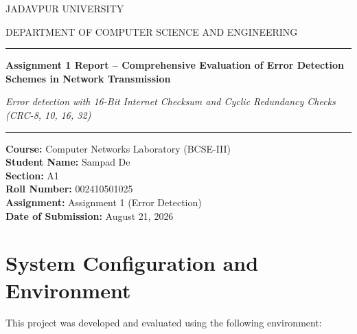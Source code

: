 \documentclass[12pt,a4paper]{article}
\begin{document}
\begin{titlepage}
    \centering
    \vspace*{1.5cm}
    
    {\small JADAVPUR UNIVERSITY \par}
    \vspace{0.8cm}
    {\small DEPARTMENT OF COMPUTER SCIENCE AND ENGINEERING\par}
    \vspace{1.2cm}
    
    \rule{\textwidth}{1.2pt}\par
    \vspace{0.4cm}
    {\huge\bfseries Assignment 1 Report -- Comprehensive Evaluation of Error Detection Schemes in Network Transmission \par}
    \vspace{0.3cm}
    {\Large\itshape Error detection with 16-Bit Internet Checksum and Cyclic Redundancy Checks (CRC-8, 10, 16, 32) \par}
    \vspace{0.4cm}
    \rule{\textwidth}{1.2pt}\par
    
    \vspace{1.5cm}
    
    \begin{flushleft} \large
        \textbf{Course:} Computer Networks Laboratory (BCSE-III) \\
        \textbf{Student Name:} Sampad De \\
        \textbf{Section:} A1 \\
        \textbf{Roll Number:} 002410501025 \\
        \textbf{Assignment:} Assignment 1 (Error Detection) \\
        \textbf{Date of Submission:} August 21, 2026
    \end{flushleft}
    
    \vfill
\end{titlepage}

\newpage
\tableofcontents
\newpage

\section*{System Configuration and Environment}
This project was developed and evaluated using the following environment:
\begin{table}[htbp]
\centering
\small
{}
\end{table}
\end{document}
